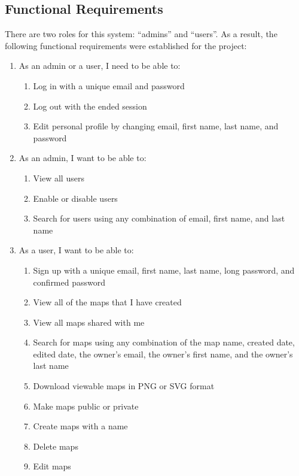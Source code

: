 \subsection{Functional Requirements}
\label{sec:Requirements>Functional Requirements}
There are two roles for this system: ``admins'' and ``users''. As a result, the following functional requirements were established for the project:
\begin{enumerate}
  \item As an admin or a user, I need to be able to:
  \begin{enumerate}
    \item Log in with a unique email and password
    \item Log out with the ended session
    \item Edit personal profile by changing email, first name, last name, and password
  \end{enumerate}
  \item As an admin, I want to be able to:
  \begin{enumerate}
    \item View all users
    \item Enable or disable users
    \item Search for users using any combination of email, first name, and last name
  \end{enumerate}
  \item As a user, I want to be able to:
  \begin{enumerate}
    \item Sign up with a unique email, first name, last name, long password, and confirmed password
    \item View all of the maps that I have created
    \item View all maps shared with me
    \item Search for maps using any combination of the map name, created date, edited date, the owner's email, the owner's first name, and the owner's last name
    \item Download viewable maps in PNG or SVG format
    \item Make maps public or private
    \item Create maps with a name
    \item Delete maps
    \item Edit maps
  \end{enumerate}
\end{enumerate}

